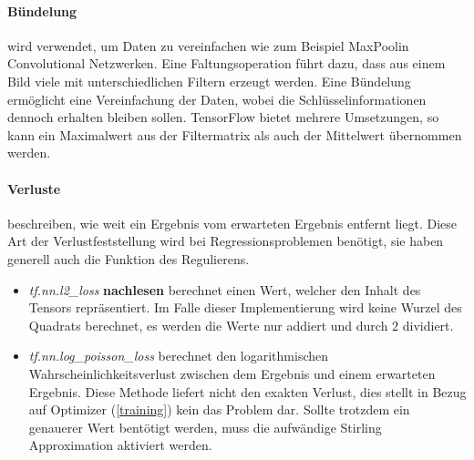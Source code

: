 \paragraph{Bündelung} wird verwendet, um Daten zu vereinfachen wie zum Beispiel \glqq MaxPool\grqq in Convolutional Netzwerken. 
Eine Faltungsoperation führt dazu, dass aus einem Bild viele mit unterschiedlichen Filtern erzeugt werden.
Eine Bündelung ermöglicht eine Vereinfachung der Daten, wobei die Schlüsselinformationen dennoch erhalten bleiben sollen. 
TensorFlow bietet mehrere Umsetzungen, so kann ein Maximalwert aus der Filtermatrix als auch der Mittelwert übernommen werden. 

\paragraph{Verluste} beschreiben, wie weit ein Ergebnis vom erwarteten Ergebnis entfernt liegt. 
Diese Art der Verlustfeststellung wird bei Regressionsproblemen benötigt, sie haben generell auch die Funktion des Regulierens.
\begin{itemize}
	\item \textit{tf.nn.l2\_loss} \textbf{nachlesen} berechnet einen Wert, welcher den Inhalt des Tensors repräsentiert. 
	Im Falle dieser Implementierung wird keine Wurzel des Quadrats berechnet,  es werden die Werte nur addiert und durch $2$ dividiert.
	\item \textit{tf.nn.log\_poisson\_loss} berechnet den logarithmischen Wahrscheinlichkeitsverlust zwischen dem Ergebnis und einem erwarteten Ergebnis. 
	Diese Methode liefert nicht den exakten Verlust, dies stellt in Bezug auf Optimizer (\ref{training}) kein das Problem dar. 
	Sollte trotzdem ein genauerer Wert bentötigt werden, muss die aufwändige Stirling Approximation \cite{feller1968introduction} aktiviert werden. 
\end{itemize}

